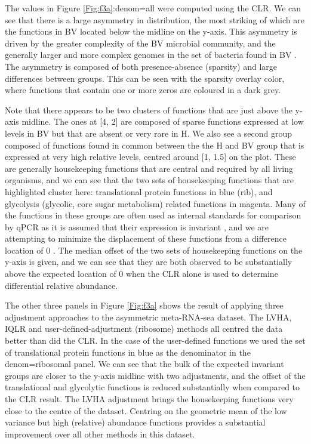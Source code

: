 \documentclass[graybox]{svmult}
\providecommand{\DIFadd}[1]{{\protect\color{blue}\uwave{#1}}} %
\providecommand{\DIFaddbegin}{} %
\providecommand{\DIFaddend}{} %
\begin{document}
  
The values in Figure \ref{Fig:f3a}:denom=all were computed using the CLR. We can see that there is a large asymmetry in distribution, the most striking of which are the functions in BV located below the midline on the y-axis. This asymmetry is driven by the greater complexity of the BV microbial community, and the generally larger and more complex genomes in the set of bacteria found in BV \cite{macklaim:2013}. The asymmetry is composed of both presence-absence (sparsity) and large differences between groups. This can be seen with the sparsity overlay color, where functions that contain one or more zeros are coloured in a dark grey. 

Note that there appears to be two clusters of functions that are just above the y-axis midline. The ones at \DIFaddbegin \DIFadd{location }[\DIFadd{x=}\DIFaddend 4, \DIFaddbegin \DIFadd{y=}\DIFaddend 2\DIFaddbegin ] \DIFaddend are composed of sparse functions expressed at low levels in BV but that are absent or very rare in H.  We also see a second group composed of functions found in common between the the H and BV group that is  expressed at very high relative levels, centred around \DIFaddbegin \DIFadd{location }[\DIFadd{x=}\DIFaddend 1, \DIFaddbegin \DIFadd{y=}\DIFaddend 1.5\DIFaddbegin ] \DIFaddend on the  plot. These are generally housekeeping functions that are central and required by all living organisms, and we can see that the two sets of housekeeping functions that are  highlighted cluster here: translational protein functions in blue (rib), and glycolysis (glycolic, core sugar metabolism) related functions in magenta. Many of the functions in these groups are often used as internal standards for comparison by qPCR as it is assumed that their expression is invariant \cite{Scott:2010}, and we are attempting to minimize the displacement of these functions from a difference location of 0 . The median offset of the two sets of housekeeping functions  on the y-axis is given, and we can see that they are both observed to be substantially above the expected location of 0 when the CLR alone is used to determine differential relative abundance.   

The other three panels in Figure \ref{Fig:f3a} shows the result of applying  three adjustment approaches to the asymmetric meta-RNA-sea dataset. The LVHA, IQLR and user-defined-adjustment (ribosome) methods all centred the data  better than did the CLR. In the case of the user-defined functions we used the set of translational protein functions in blue as the denominator in the denom=ribosomal panel. We can see that the bulk of the expected invariant groups are closer to the y-axis midline with two adjustments, and the offset of the translational and glycolytic functions is reduced substantially when compared to the CLR result. The LVHA adjustment brings the housekeeping functions very close to the centre of the dataset.  Centring on the geometric mean of the low variance but high (relative) abundance functions provides a substantial improvement over all other methods in this dataset.
\end{document}
